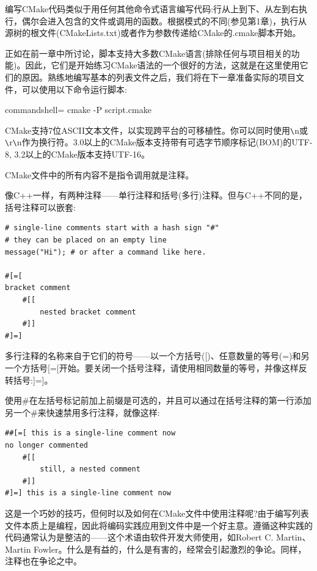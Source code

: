 
编写CMake代码类似于用任何其他命令式语言编写代码:行从上到下、从左到右执行，偶尔会进入包含的文件或调用的函数。根据模式的不同(参见第1章)，执行从源树的根文件(CMakeLists.txt)或者作为参数传递给CMake的.cmake脚本开始。

正如在前一章中所讨论，脚本支持大多数CMake语言(排除任何与项目相关的功能)。因此，它们是开始练习CMake语法的一个很好的方法，这就是在这里使用它们的原因。熟练地编写基本的列表文件之后，我们将在下一章准备实际的项目文件，可以使用以下命令运行脚本:

\begin{tcblisting}{commandshell={}}
cmake -P script.cmake
\end{tcblisting}

\begin{tcolorbox}[colback=blue!5!white,colframe=blue!75!black,title=Note]
CMake支持7位ASCII文本文件，以实现跨平台的可移植性。你可以同时使用\verb|\|n或\verb|\|r\verb|\|n作为换行符。3.0以上的CMake版本支持带有可选字节顺序标记(BOM)的UTF-8, 3.2以上的CMake版本支持UTF-16。
\end{tcolorbox}

CMake文件中的所有内容不是指令调用就是注释。


像C++一样，有两种注释——单行注释和括号(多行)注释。但与C++不同的是，括号注释可以嵌套:

\begin{lstlisting}[style=styleCMake]	
# single-line comments start with a hash sign "#"
# they can be placed on an empty line
message("Hi"); # or after a command like here.

#[=[
bracket comment
	#[[
		nested bracket comment
	#]]
#]=]
\end{lstlisting}

多行注释的名称来自于它们的符号——以一个方括号([)、任意数量的等号(=)和另一个方括号[=[开始。要关闭一个括号注释，请使用相同数量的等号，并像这样反转括号:]=]。

使用\#在左括号标记前加上前缀是可选的，并且可以通过在括号注释的第一行添加另一个\#来快速禁用多行注释，就像这样:

\begin{lstlisting}[style=styleCMake]	
##[=[ this is a single-line comment now
no longer commented
	#[[
		still, a nested comment
	#]]
#]=] this is a single-line comment now
\end{lstlisting}

这是一个巧妙的技巧，但何时以及如何在CMake文件中使用注释呢?由于编写列表文件本质上是编程，因此将编码实践应用到文件中是一个好主意。遵循这种实践的代码通常认为是整洁的——这个术语由软件开发大师使用，如Robert C. Martin、Martin Fowler。什么是有益的，什么是有害的，经常会引起激烈的争论。同样，注释也在争论之中。

